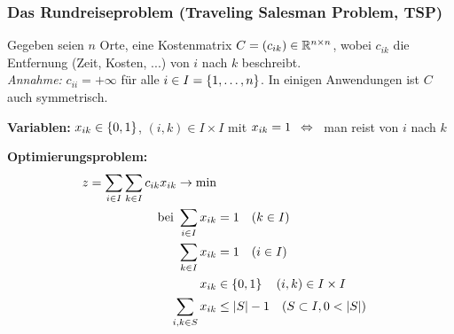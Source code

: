 

\subsubsection{Das Rundreiseproblem (Traveling Salesman Problem, TSP)}

Gegeben seien $n$ Orte, eine Kostenmatrix $C = (c_{ik}) \in \mathbb{R}^{n \times n}$, wobei $c_{ik}$ die Entfernung (Zeit, Kosten, ...) von $i$ nach $k$ beschreibt. \\
\textit{Annahme:} $c_{ii} = + \infty$ für alle $i \in I = \left\{ 1, \dots, n \right\}$. In einigen Anwendungen ist $C$ auch symmetrisch.

\textbf{Variablen:} $x_{ik} \in \left\{ 0,1 \right\}$, $(i,k) \in I \times I$ mit $x_{ik} = 1 \enskip \Leftrightarrow \enskip $ man reist von $i$ nach $k$

\textbf{Optimierungsproblem:}
\begin{align}
	z = \sum_{i \in I} \sum_{k \in I} c_{ik} x_{ik} \to \min 
	\label{eq: 4.1} \\
	\text{ bei } \sum_{i \in I} x_{ik} &= 1 \quad (k \in I) 
	\label{eq: 4.2} \\
	\sum_{k \in I} x_{ik} &= 1 \quad (i \in I)
	\label{eq: 4.3} \\
	x_{ik} &\in \left\{ 0,1 \right\} \quad (i,k) \in I \times I 
	\label{eq: 4.4} \\
	\sum_{i,k\in S} x_{ik} &\le \left| S \right| - 1 \quad (S \subset I, 0 < \left| S \right|)
	\label{eq: 4.5} 
\end{align}

